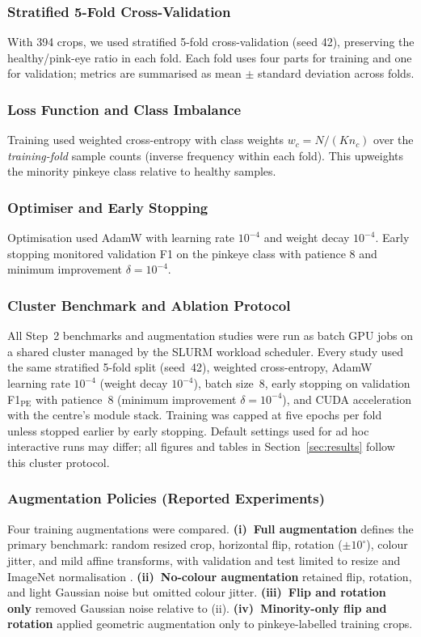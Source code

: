 \documentclass[10pt,journal,compsoc]{IEEEtran}
\begin{document}
\subsubsection{Stratified 5-Fold Cross-Validation}
With 394 crops, we used stratified 5-fold cross-validation (seed 42),
preserving the healthy/pink-eye ratio in each fold. Each fold uses four
parts for training and one for validation; metrics are summarised as
mean $\pm$ standard deviation across folds.

\subsubsection{Loss Function and Class Imbalance}
Training used weighted cross-entropy with class weights
$w_c = N / (K n_c)$ over the \emph{training-fold} sample counts (inverse
frequency within each fold). This upweights
the minority pinkeye class relative to healthy samples.

\subsubsection{Optimiser and Early Stopping}
Optimisation used AdamW \cite{loshchilov2018adamw} with learning rate
$10^{-4}$ and weight decay $10^{-4}$. Early stopping monitored validation
F1 on the pinkeye class with patience 8 and minimum improvement
$\delta = 10^{-4}$.

\subsubsection{Cluster Benchmark and Ablation Protocol}
\label{subsubsec:cluster_benchmark_protocol}
All Step~2 benchmarks and augmentation studies were run as batch GPU jobs
on a shared cluster managed by the SLURM workload scheduler. Every study
used the same stratified 5-fold split (seed~42), weighted cross-entropy,
AdamW learning rate $10^{-4}$ (weight decay $10^{-4}$), batch size~8,
early stopping on validation F1$_{\mathrm{PE}}$ with patience~8
(minimum improvement $\delta{=}10^{-4}$), and CUDA acceleration with
the centre's module stack. Training was capped at five epochs per fold
unless stopped earlier by early stopping. Default settings used for ad hoc
interactive runs may differ; all figures and tables in
Section~\ref{sec:results} follow this cluster protocol.

\subsubsection{Augmentation Policies (Reported Experiments)}
\label{subsubsec:aug_policies}
Four training augmentations were compared. \textbf{(i)~Full augmentation}
defines the primary benchmark: random resized crop, horizontal flip,
rotation ($\pm 10^{\circ}$), colour jitter, and mild affine transforms,
with validation and test limited to resize and ImageNet normalisation
\cite{rw2019timm}. \textbf{(ii)~No-colour augmentation} retained flip,
rotation, and light Gaussian noise but omitted colour jitter.
\textbf{(iii)~Flip and rotation only} removed Gaussian noise relative to
(ii). \textbf{(iv)~Minority-only flip and rotation} applied geometric
augmentation only to pinkeye-labelled training crops.
\end{document}
